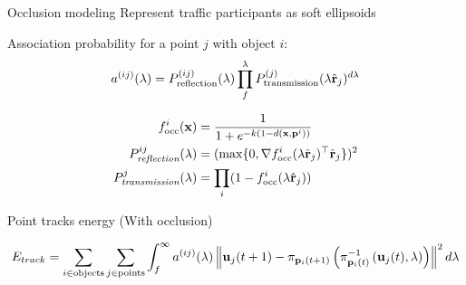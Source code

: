 % 
\begin{frame}{Occlusion modeling}
  Represent traffic participants as soft ellipsoids
  \centering
  
  Association probability for a point $j$ with object $i$: 
  \[a^{(ij)}(\lambda) = P^{(ij)}_{\text{reflection}}(\lambda)\prod_{f}^{\lambda}P^{(j)}_{\text{transmission}}(\lambda \hat{\mathbf{r}}_j)^{d\lambda}\]
\end{frame}

\begin{frame}
  \centering
  
    \begin{align}
      f^i_{\text{occ}}(\mathbf{x}) &= \frac{1}{1 + e^{-k(1 - d(\mathbf{x},\mathbf{p}^{i}))}} \\
      P^{ij}_{\textit{reflection}} (\lambda) &= (\max \{0, \nabla {f^i_{\text{occ}}}(\lambda \hat{\mathbf{r}}_j)^\top \hat{\mathbf{r}}_j \})^2 \\
      P^j_{\textit{transmission}}(\lambda) &= \prod_i (1 - f^i_{\text{occ}}({\lambda \hat{\mathbf{r}}_j}))
    \end{align}
\end{frame}

\begin{frame}{Point tracks energy (With occlusion)}
  \centering
  \small{
  
  \begin{align*}
    E_{track} = 
    \sum_{i \in \text{objects}}
    \sum_{j \in \text{points}}
    \int_{f}^{\infty}
      a^{(ij)}(\lambda)
      \left\|\mathbf{u}_j(t+1) - \pi_{\mathbf{p}_{i}({t+1})}\left(\pi^{-1}_{\mathbf{p}_{i}({t})}\left(\mathbf{u}_j(t), \lambda\right)\right)\right\|^2
      d\lambda
  \end{align*}
}
\end{frame}

